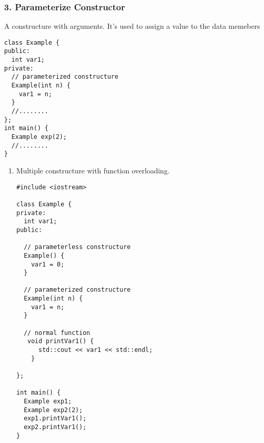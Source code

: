 \documentclass[11pt]{article}
\begin{document}
\subsubsection{3. Parameterize Constructor}
\label{sec:org9e01403}
A constructure with arguments. It's used to assign a value to the data memebers
\begin{verbatim}
class Example {
public:
  int var1;
private:
  // parameterized constructure
  Example(int n) {
    var1 = n;
  }
  //........
};
int main() {
  Example exp(2);
  //........
}
\end{verbatim}
\begin{enumerate}
\item Multiple constructure with function overloading.
\label{sec:orge0b6a49}
\begin{verbatim}
#include <iostream>

class Example {
private:
  int var1;
public:

  // parameterless constructure
  Example() {
    var1 = 0;
  }

  // parameterized constructure
  Example(int n) {
    var1 = n;
  }

  // normal function
   void printVar1() {
      std::cout << var1 << std::endl;
    }

};

int main() {
  Example exp1;
  Example exp2(2);
  exp1.printVar1();
  exp2.printVar1();
}
\end{verbatim}
\end{enumerate}
\end{document}
